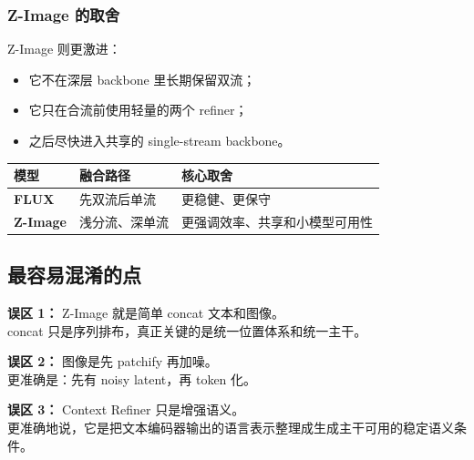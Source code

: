 \subsubsection{Z-Image 的取舍}

Z-Image 则更激进：

\begin{itemize}[leftmargin=1.5em]
  \item 它不在深层 backbone 里长期保留双流；
  \item 它只在合流前使用轻量的两个 refiner；
  \item 之后尽快进入共享的 single-stream backbone。
\end{itemize}

\begin{summarybox}
\begin{center}
{\small
\begin{tabular}{p{3cm}p{4.5cm}p{4.5cm}}
\hline
\textbf{模型} & \textbf{融合路径} & \textbf{核心取舍} \\
\hline
\textbf{FLUX} & 先双流后单流 & 更稳健、更保守 \\
\textbf{Z-Image} & 浅分流、深单流 & 更强调效率、共享和小模型可用性 \\
\hline
\end{tabular}
}
\end{center}
\end{summarybox}

\subsection{最容易混淆的点}

\begin{warnbox}
\textbf{误区 1：} Z-Image 就是简单 concat 文本和图像。\\
 concat 只是序列排布，真正关键的是统一位置体系和统一主干。
\end{warnbox}

\begin{warnbox}
\textbf{误区 2：} 图像是先 patchify 再加噪。\\
 更准确是：先有 noisy latent，再 token 化。
\end{warnbox}

\begin{warnbox}
\textbf{误区 3：} Context Refiner 只是增强语义。\\
 更准确地说，它是把文本编码器输出的语言表示整理成生成主干可用的稳定语义条件。
\end{warnbox}

